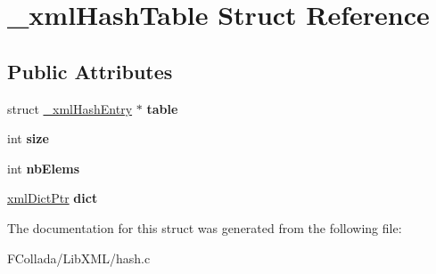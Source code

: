 \hypertarget{struct__xmlHashTable}{
\section{\_\-xmlHashTable Struct Reference}
\label{struct__xmlHashTable}
}
\subsection*{Public Attributes}
\begin{DoxyCompactItemize}
\item 
\hypertarget{struct__xmlHashTable_a36da1d191581b8afcd9d4dd4ad4faed0}{
struct \hyperlink{struct__xmlHashEntry}{\_\-xmlHashEntry} $\ast$ {\bfseries table}}
\label{struct__xmlHashTable_a36da1d191581b8afcd9d4dd4ad4faed0}

\item 
\hypertarget{struct__xmlHashTable_af5dc56ca553b3e58479421549723c3f6}{
int {\bfseries size}}
\label{struct__xmlHashTable_af5dc56ca553b3e58479421549723c3f6}

\item 
\hypertarget{struct__xmlHashTable_ab86af20391eb658fe03ed749500512f2}{
int {\bfseries nbElems}}
\label{struct__xmlHashTable_ab86af20391eb658fe03ed749500512f2}

\item 
\hypertarget{struct__xmlHashTable_a7c6a48021fd6151daba2e5b0eb473ec8}{
\hyperlink{struct__xmlDict}{xmlDictPtr} {\bfseries dict}}
\label{struct__xmlHashTable_a7c6a48021fd6151daba2e5b0eb473ec8}

\end{DoxyCompactItemize}


The documentation for this struct was generated from the following file:\begin{DoxyCompactItemize}
\item 
FCollada/LibXML/hash.c\end{DoxyCompactItemize}
